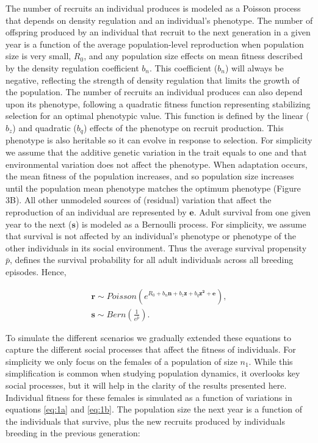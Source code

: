 \documentclass{article}
\begin{document}
The number of recruits an individual produces is modeled as a Poisson process that depends on density regulation and an individual's phenotype. The number of offspring produced by an individual that recruit to the next generation in a given year is a function of the average population-level reproduction when population size is very small, $R_0$, and any population size effects on mean fitness described by the density regulation coefficient $b_{n}$. This coefficient ($b_{n}$) will always be negative, reflecting the strength of density regulation that limits the growth of the population. The number of recruits an individual produces can also depend upon its phenotype, following a quadratic fitness function representing stabilizing selection for an optimal phenotypic value. This function is defined by the linear ($b_z$) and quadratic ($b_q$) effects of the phenotype on recruit production. This phenotype is also heritable so it can evolve in response to selection. For simplicity we assume that the additive genetic variation in the trait equals to one and that environmental variation does not affect the phenotype. When adaptation occurs, the mean fitness of the population increases, and so population size increases until the population mean phenotype matches the optimum phenotype (Figure 3B). All other unmodeled sources of (residual) variation that affect the reproduction of an individual are represented by $\mathbf{e}$. Adult survival from one given year to the next ($\mathbf{s}$) is modeled as a Bernoulli process. For simplicity, we assume that survival is not affected by an individual's phenotype or phenotype of the other individuals in its social environment. Thus the average survival propensity $\bar{p}$, defines the survival probability for all adult individuals across all breeding episodes. Hence,

\begin{subequations} 
\begin{gather}
\mathbf{r}\sim Poisson(e^{R_{0} + b_{n} \mathbf{n} + b_{z} \mathbf{z} + b_{q} \mathbf{z^2} + \mathbf{e}}), \label{eq:1a} \\
\mathbf{s}\sim Bern(\frac{1}{e^{\bar{p}}}). \label{eq:1b}
\end{gather}
\end{subequations}

To simulate the different scenarios we gradually extended these equations to capture the different social processes that affect the fitness of individuals. For simplicity we only focus on the females of a population of size $n_{1}$. While this simplification is common when studying population dynamics, it overlooks key social processes, but it will help in the clarity of the results presented here. Individual fitness for these females is simulated as a function of variations in equations \ref{eq:1a} and \ref{eq:1b}. The population size the next year is a function of the individuals that survive, plus the new recruits produced by individuals breeding in the previous generation:
\end{document}
